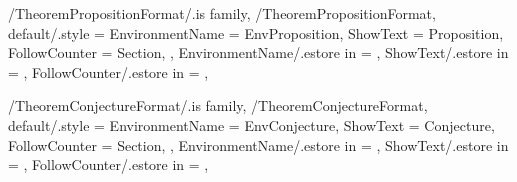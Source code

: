 \newcommand{\InitTheoremCorollarieFormat}
{%
  \theoremstyle{plain}%
  \ifthenelse{\equal{\GetTheoremCorollarieFormatFollowCounter}{\empty}}%
  {%
    \newtheorem{%
      \GetTheoremCorollarieFormatEnvironmentName}{%
      \GetTheoremCorollarieFormatShowText}%
  }%
  {%
    \MappingTheoremCounter[Corollarie]{\GetTheoremCorollarieFormatFollowCounter}%
    \newtheorem{%
      \GetTheoremCorollarieFormatEnvironmentName}{%
      \GetTheoremCorollarieFormatShowText}[%
      \GetTheoremCorollarieFormatFollowCounter]%
  }%
} %


\pgfkeys
{
  /TheoremPropositionFormat/.is family, /TheoremPropositionFormat,
  default/.style =
  {
    EnvironmentName = {EnvProposition},
    ShowText = {Proposition},
    FollowCounter = Section,
  },
  EnvironmentName/.estore in = \GetTheoremPropositionFormatEnvironmentName,
  ShowText/.estore in = \GetTheoremPropositionFormatShowText,
  FollowCounter/.estore in = \GetTheoremPropositionFormatFollowCounter,
} %

\newcommand{\InsertProposition}[2][\empty]
{%
  \InsertTheoremContent[#1]{\GetTheoremPropositionFormatEnvironmentName}{#2}%
} %

\newcommand{\InitTheoremPropositionFormat}
{%
  \theoremstyle{plain}%
  \ifthenelse{\equal{\GetTheoremPropositionFormatFollowCounter}{\empty}}%
  {%
    \newtheorem{%
      \GetTheoremPropositionFormatEnvironmentName}{%
      \GetTheoremPropositionFormatShowText}%
  }%
  {%
    \MappingTheoremCounter[Proposition]{\GetTheoremPropositionFormatFollowCounter}%
    \newtheorem{%
      \GetTheoremPropositionFormatEnvironmentName}{%
      \GetTheoremPropositionFormatShowText}[%
      \GetTheoremPropositionFormatFollowCounter]%
  }%
} %


\pgfkeys
{
  /TheoremConjectureFormat/.is family, /TheoremConjectureFormat,
  default/.style =
  {
    EnvironmentName = {EnvConjecture},
    ShowText = {Conjecture},
    FollowCounter = Section,
  },
  EnvironmentName/.estore in = \GetTheoremConjectureFormatEnvironmentName,
  ShowText/.estore in = \GetTheoremConjectureFormatShowText,
  FollowCounter/.estore in = \GetTheoremConjectureFormatFollowCounter,
} %

\newcommand{\InsertConjecture}[2][\empty]
{%
  \InsertTheoremContent[#1]{\GetTheoremConjectureFormatEnvironmentName}{#2}%
} %

